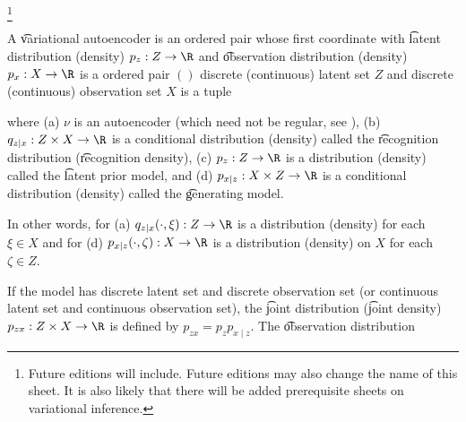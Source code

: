 
\footnote{Future editions will include. Future editions may also change the name of this sheet. It is also likely that there will be added prerequisite sheets on variational inference.}



A \t{variational autoencoder} is an ordered pair whose first coordinate with \t{latent distribution} (density) $p_z: Z \to \R$ and \t{observation distribution} (density) $p_x: X \to \R$ is a ordered pair $()$ discrete (continuous) latent set $Z$ and discrete (continuous) observation set $X$ is a tuple



where
(a) $\nu$ is an autoencoder (which need not be regular, see ),
(b) $q_{z \mid x}: Z \times X \to \R$ is a conditional distribution (density) called the \t{recognition distribution} (\t{recognition density}),
(c) $p_{z}: Z \to \R$ is a distribution (density) called the \t{latent prior model}, and
(d) $p_{x \mid z}: X \times Z \to \R$ is a conditional distribution (density) called the \t{generating model}.

In other words, for (a) $q_{z \mid x}(\cdot, \xi): Z \to \R$ is a distribution (density) for each $\xi \in X$ and for (d) $p_{x \mid z}(\cdot, \zeta): X \to \R$ is a distribution (density) on $X$ for each $\zeta \in Z$.

If the model has discrete latent set and discrete observation set (or continuous latent set and continuous observation set), the \t{joint distribution} (\t{joint density}) $p_{zx}: Z \times X \to \R$ is defined by $p_{zx} = p_{z}p_{x \mid z}$.
The \t{observation distribution}


